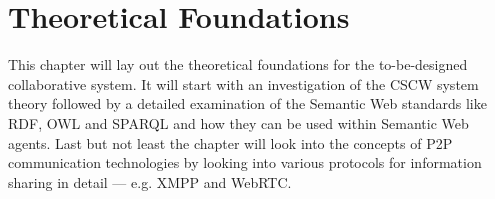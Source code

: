 
\chapter{Theoretical Foundations} %
\label{cha:theoretical_foundations}

This chapter will lay out the theoretical foundations for the to-be-designed collaborative system. It will start with an investigation of the \gls{CSCW} system theory followed by a detailed examination of the Semantic Web standards like \gls{RDF}, \gls{OWL} and \gls{SPARQL} and how they can be used within Semantic Web agents. Last but not least the chapter will look into the concepts of \gls{P2P} communication technologies by looking into various protocols for information sharing in detail --- e.g. \gls{XMPP} and \gls{WebRTC}.







